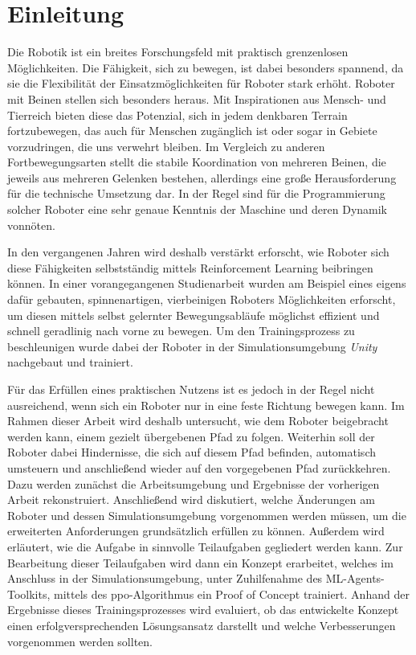 \chapter{Einleitung}
\label{sec:einleitung}
Die Robotik ist ein breites Forschungsfeld mit praktisch grenzenlosen Möglichkeiten.
Die Fähigkeit, sich zu bewegen, ist dabei besonders spannend, da sie die Flexibilität der Einsatzmöglichkeiten für Roboter stark erhöht.
Roboter mit Beinen stellen sich besonders heraus.
Mit Inspirationen aus Mensch- und Tierreich bieten diese das Potenzial, sich in jedem denkbaren Terrain fortzubewegen, das auch für Menschen zugänglich ist oder sogar in Gebiete vorzudringen, die uns verwehrt bleiben.
Im Vergleich zu anderen Fortbewegungsarten stellt die stabile Koordination von mehreren Beinen, die jeweils aus mehreren Gelenken bestehen, allerdings eine große Herausforderung für die technische Umsetzung dar.
In der Regel sind für die Programmierung solcher Roboter eine sehr genaue Kenntnis der Maschine und deren Dynamik vonnöten.

In den vergangenen Jahren wird deshalb verstärkt erforscht, wie Roboter sich diese Fähigkeiten selbstständig mittels Reinforcement Learning beibringen können.
In einer vorangegangenen Studienarbeit wurden am Beispiel eines eigens dafür gebauten, spinnenartigen, vierbeinigen Roboters Möglichkeiten erforscht, um diesen mittels selbst gelernter Bewegungsabläufe möglichst effizient und schnell geradlinig nach vorne zu bewegen.
Um den Trainingsprozess zu beschleunigen wurde dabei der Roboter in der Simulationsumgebung \emph{Unity} nachgebaut und trainiert.

Für das Erfüllen eines praktischen Nutzens ist es jedoch in der Regel nicht ausreichend, wenn sich ein Roboter nur in eine feste Richtung bewegen kann.
Im Rahmen dieser Arbeit wird deshalb untersucht, wie dem Roboter beigebracht werden kann, einem gezielt übergebenen Pfad zu folgen.
Weiterhin soll der Roboter dabei Hindernisse, die sich auf diesem Pfad befinden, automatisch umsteuern und anschließend wieder auf den vorgegebenen Pfad zurückkehren. %
Dazu werden zunächst die Arbeitsumgebung und Ergebnisse der vorherigen Arbeit rekonstruiert.
Anschließend wird diskutiert, welche Änderungen am Roboter und dessen Simulationsumgebung vorgenommen werden müssen, um die erweiterten Anforderungen grundsätzlich erfüllen zu können.
Außerdem wird erläutert, wie die Aufgabe in sinnvolle Teilaufgaben gegliedert werden kann.
Zur Bearbeitung dieser Teilaufgaben wird dann ein Konzept erarbeitet, welches im Anschluss in der Simulationsumgebung, unter Zuhilfenahme des ML-Agents-Toolkits, mittels des \acl{ppo}-Algorithmus ein Proof of Concept trainiert.
Anhand der Ergebnisse dieses Trainingsprozesses wird evaluiert, ob das entwickelte Konzept einen erfolgversprechenden Lösungsansatz darstellt und welche Verbesserungen vorgenommen werden sollten.

